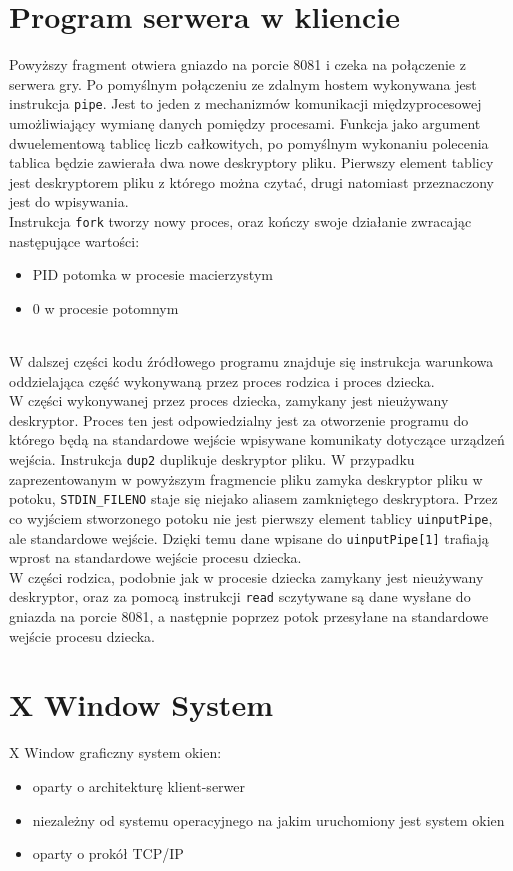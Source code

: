 \begin{appendices}
\section{Program serwera w kliencie}
\label{app:server_c}

Powyższy fragment otwiera gniazdo na porcie 8081 i czeka na połączenie z serwera gry. Po pomyślnym połączeniu ze zdalnym hostem wykonywana jest instrukcja \lstinline|pipe|. Jest to jeden z mechanizmów komunikacji międzyprocesowej umożliwiający wymianę danych pomiędzy procesami. Funkcja jako argument dwuelementową tablicę liczb całkowitych, po pomyślnym wykonaniu polecenia tablica będzie zawierała dwa nowe deskryptory pliku. Pierwszy element tablicy jest deskryptorem pliku z którego można czytać, drugi natomiast przeznaczony jest do wpisywania.
\\
Instrukcja \lstinline|fork| tworzy nowy proces, oraz kończy swoje działanie zwracając następujące wartości:
\\
\begin{itemize}
	\item PID potomka w procesie macierzystym
	\item 0 w procesie potomnym
\end{itemize}
\\
W dalszej części kodu źródłowego programu znajduje się instrukcja warunkowa oddzielająca część wykonywaną przez proces rodzica i proces dziecka. 
\\
W części wykonywanej przez proces dziecka, zamykany jest nieużywany deskryptor. Proces ten jest odpowiedzialny jest za otworzenie programu do którego będą na standardowe wejście wpisywane komunikaty dotyczące urządzeń wejścia. Instrukcja \lstinline|dup2| duplikuje deskryptor pliku. W przypadku zaprezentowanym w powyższym fragmencie pliku zamyka deskryptor pliku w potoku, \lstinline|STDIN_FILENO| staje się niejako aliasem zamkniętego deskryptora. Przez co wyjściem stworzonego potoku nie jest pierwszy element tablicy \lstinline|uinputPipe|, ale standardowe wejście. Dzięki temu dane wpisane do \lstinline|uinputPipe[1]| trafiają wprost na standardowe wejście procesu dziecka.
\\
W części rodzica, podobnie jak w procesie dziecka zamykany jest nieużywany deskryptor, oraz za pomocą instrukcji \lstinline|read| sczytywane są dane wysłane do gniazda na porcie 8081, a następnie poprzez potok przesyłane na standardowe wejście procesu dziecka.
		


\newpage
\section{X Window System}
\label{app:X Window System}
X Window graficzny system okien:
\begin{itemize}
	\item oparty o architekturę klient-serwer
	\item niezależny od systemu operacyjnego na jakim uruchomiony jest system okien
	\item oparty o prokół TCP/IP
\end{itemize}


\end{appendices}
